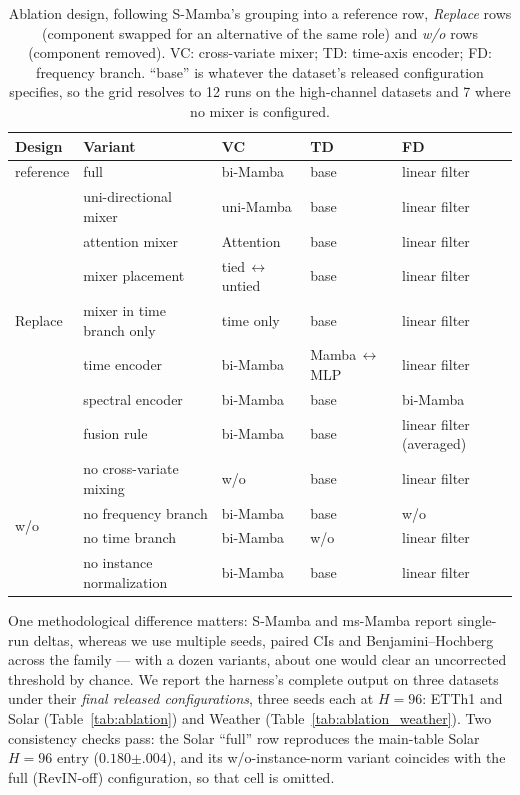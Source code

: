 \documentclass[review,12pt]{elsarticle}
\begin{document}
\begin{table}[tb]
\centering
\caption{Ablation design, following S-Mamba's grouping into a reference row,
\emph{Replace} rows (component swapped for an alternative of the same role)
and \emph{w/o} rows (component removed). VC: cross-variate mixer; TD:
time-axis encoder; FD: frequency branch. ``base'' is whatever the dataset's
released configuration specifies, so the grid resolves to 12 runs on the
high-channel datasets and 7 where no mixer is configured.}
\label{tab:ablation_grid}
\scriptsize
\setlength{\tabcolsep}{4pt}
\begin{tabular}{@{}ll lll@{}}
\toprule
Design & Variant & VC & TD & FD \\
\midrule
reference & full & bi-Mamba & base & linear filter \\
\midrule
\multirow{7}{*}{Replace}
 & uni-directional mixer & uni-Mamba & base & linear filter \\
 & attention mixer & Attention & base & linear filter \\
 & mixer placement & tied\,$\leftrightarrow$\,untied & base & linear filter \\
 & mixer in time branch only & time only & base & linear filter \\
 & time encoder & bi-Mamba & Mamba\,$\leftrightarrow$\,MLP & linear filter \\
 & spectral encoder & bi-Mamba & base & bi-Mamba \\
 & fusion rule & bi-Mamba & base & linear filter (averaged) \\
\midrule
\multirow{4}{*}{w/o}
 & no cross-variate mixing & w/o & base & linear filter \\
 & no frequency branch & bi-Mamba & base & w/o \\
 & no time branch & bi-Mamba & w/o & linear filter \\
 & no instance normalization & bi-Mamba & base & linear filter \\
\bottomrule
\end{tabular}
\end{table}

One methodological difference matters: S-Mamba and ms-Mamba report
single-run deltas, whereas we use multiple seeds, paired CIs and
Benjamini--Hochberg across the family --- with a dozen variants, about one
would clear an uncorrected threshold by chance. We report the harness's
complete output on three datasets under their \emph{final released
configurations}, three seeds each at $H{=}96$: ETTh1 and Solar
(Table~\ref{tab:ablation}) and Weather (Table~\ref{tab:ablation_weather}).
Two consistency checks pass: the Solar ``full'' row reproduces the main-table
Solar $H{=}96$ entry ($0.180{\scriptstyle\pm.004}$), and its
w/o-instance-norm variant coincides with the full (RevIN-off) configuration,
so that cell is omitted.
\end{document}
